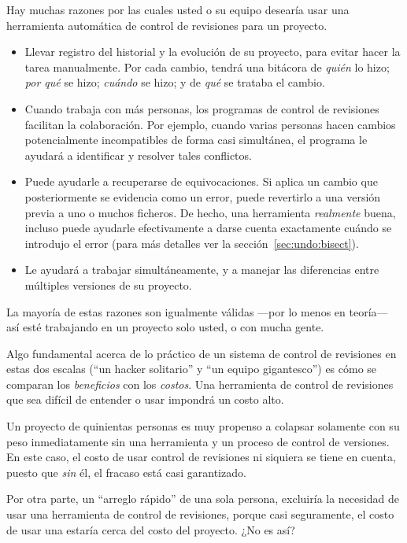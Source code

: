 Hay muchas razones por las cuales usted o su equipo desearía usar una
herramienta automática de control de revisiones para un proyecto.
\begin{itemize}
\item Llevar registro del historial y la evolución de su proyecto, para
  evitar hacer la tarea manualmente. Por cada cambio, tendrá una
  bitácora de \emph{quién} lo hizo; \emph{por qué} se hizo;
  \emph{cuándo} se hizo; y de \emph{qué} se trataba el cambio.
\item Cuando trabaja con más personas, los programas de control de
  revisiones facilitan la colaboración.  Por ejemplo, cuando varias
  personas hacen cambios potencialmente incompatibles de forma casi
  simultánea, el programa le ayudará a identificar y resolver tales
  conflictos.
\item Puede ayudarle a recuperarse de equivocaciones. Si aplica un
  cambio que posteriormente se evidencia como un error, puede
  revertirlo a una versión previa a uno o muchos ficheros. De hecho,
  una herramienta \emph{realmente} buena, incluso puede ayudarle
  efectivamente a darse cuenta exactamente cuándo se introdujo el
  error (para más detalles ver la sección~\ref{sec:undo:bisect}).
\item Le ayudará a trabajar simultáneamente, y a manejar las diferencias
  entre múltiples versiones de su proyecto.
\end{itemize}
La mayoría de estas razones son igualmente válidas ---por lo menos en
teoría--- así esté trabajando en un proyecto solo usted, o con mucha gente.

Algo fundamental acerca de lo práctico de un sistema de control de
revisiones en estas dos escalas (``un hacker solitario'' y ``un equipo
gigantesco'') es cómo se comparan los \emph{beneficios} con los
\emph{costos}.  Una herramienta de control de revisiones que sea
difícil de entender o usar impondrá un costo alto.

Un proyecto de quinientas personas es muy propenso a colapsar
solamente con su peso inmediatamente sin una herramienta y un proceso
de control de versiones. En este caso, el costo de usar control de
revisiones ni siquiera se tiene en cuenta, puesto que \emph{sin} él,
el fracaso está casi garantizado.

Por otra parte, un ``arreglo rápido'' de una sola persona, excluiría
la necesidad de usar una herramienta de control de revisiones, porque
casi seguramente, el costo de usar una estaría cerca del costo del
proyecto. ¿No es así?

